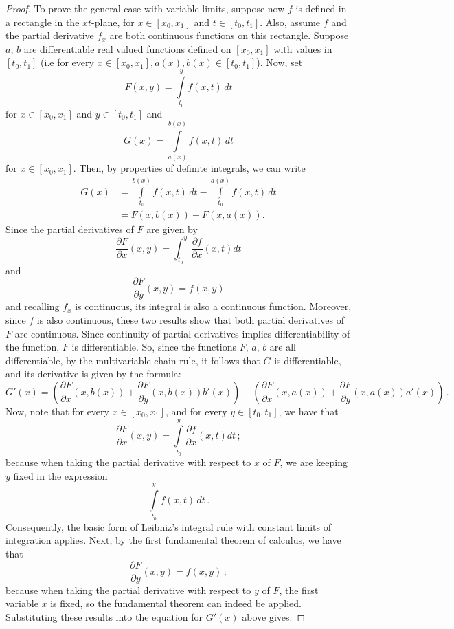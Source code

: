 \begin{proof}
To prove the general case with variable limits, suppose now $f$ is defined in a rectangle in the $xt$-plane, for $x\in [x_{0},x_{1}]$ and $t\in [t_{0},t_{1}]$. Also, assume $f$ and the partial derivative $f_x$ are both continuous functions on this rectangle. Suppose $a,\,b$ are differentiable real valued functions defined on $[x_{0},x_{1}]$ with values in $[t_{0},t_{1}]$ (i.e for every $\displaystyle x\in [x_{0},x_{1}],a(x),b(x)\in [t_{0},t_{1}]$). Now, set
$$
\displaystyle F(x,y)=\int\limits _{t_{0}}^{y}f(x,t)\,dt
$$
for $x\in [x_{0},x_{1}]$ and $y\in [t_{0},t_{1}]$ and
$$
\displaystyle G(x)=\int\limits _{a(x)}^{b(x)}f(x,t)\,dt
$$ for $x\in [x_{0},x_{1}]$. Then, by properties of definite integrals, we can write
$$
\displaystyle {\begin{aligned}G(x)&=\int\limits _{t_{0}}^{b(x)}f(x,t)\,dt-\int\limits _{t_{0}}^{a(x)}f(x,t)\,dt\\&=F(x,b(x))-F(x,a(x)).\end{aligned}}
$$
Since the partial derivatives of $F$ are given by $$\dfrac{\partial F}{\partial x}(x,y)=\int _{t_{0}}^{y}{\dfrac {\partial f}{\partial x}}(x,t)dt$$ and $$\dfrac {\partial F}{\partial y}(x,y)=f(x,y)$$ and recalling $f_x$ is continuous, its integral is also a continuous function. Moreover,  since $f$ is also continuous, these two results show that both  partial derivatives of $F$  are continuous. Since continuity of partial derivatives implies differentiability of the function, $F$ is  differentiable. So, since the functions $F,\,a,\,b$ are all differentiable, by the multivariable chain rule, it follows that $G$ is differentiable, and its derivative is given by the formula:
$$
\displaystyle G'(x)=\left({\dfrac {\partial F}{\partial x}}\left(x,b(x)\right)+{\dfrac {\partial F}{\partial y}}\left(x,b(x)\right)b'(x)\right)-\left({\dfrac {\partial F}{\partial x}}\left(x,a(x)\right)+{\dfrac {\partial F}{\partial y}}\left(x,a(x)\right)a'(x)\right)\,.
$$
Now, note that for every $x\in [x_{0},x_{1}]$, and for every $y\in [t_{0},t_{1}]$, we have that 
$$\displaystyle {\dfrac {\partial F}{\partial x}}(x,y)=\int\limits _{t_{0}}^{y}{\dfrac {\partial f}{\partial x}}(x,t)dt\, ;$$ because when taking the partial derivative with respect to $x$ of $F$, we are keeping $y$  fixed in the expression 
$$
\displaystyle \int\limits _{t_{0}}^{y}f(x,t)\,dt\,.
$$
Consequently, the basic form of Leibniz's integral rule with constant limits of integration applies. Next, by the first fundamental theorem of calculus, we have that $$\displaystyle {\dfrac {\partial F}{\partial y}}(x,y)=f(x,y)\,;$$ because when taking the partial derivative with respect to $y$ of $F$, the first variable $x$ is fixed, so the fundamental theorem can indeed be applied. Substituting these results into the equation for $G'(x)$ above gives:

\end{proof}
